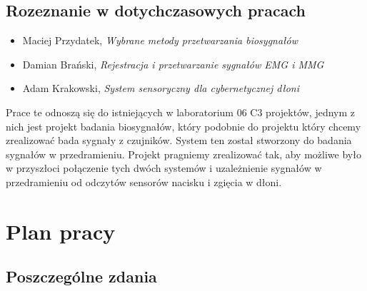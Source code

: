 \documentclass{article}
\begin{document}
\subsection{Rozeznanie w dotychczasowych pracach}
\begin{itemize}
\item Maciej Przydatek, \textit{Wybrane metody przetwarzania biosygnałów}
\item Damian Brański,  \textit{Rejestracja i przetwarzanie sygnałów EMG i MMG}
\item Adam Krakowski, \textit{System sensoryczny dla cybernetycznej dłoni}
\end{itemize}

Prace te odnoszą się do istniejących w laboratorium 06 C3 projektów, jednym z nich jest projekt badania biosygnałów, który podobnie do projektu który chcemy zrealizować bada sygnały z czujników. System ten został stworzony do badania sygnałów w przedramieniu. Projekt pragniemy zrealizować tak, aby możliwe było w przyszłoci połączenie tych dwóch systemów i uzależnienie sygnałów w przedramieniu od odczytów sensorów nacisku i zgięcia w dłoni.

\section{Plan pracy}
\subsection{Poszczególne zdania}
\end{document}
